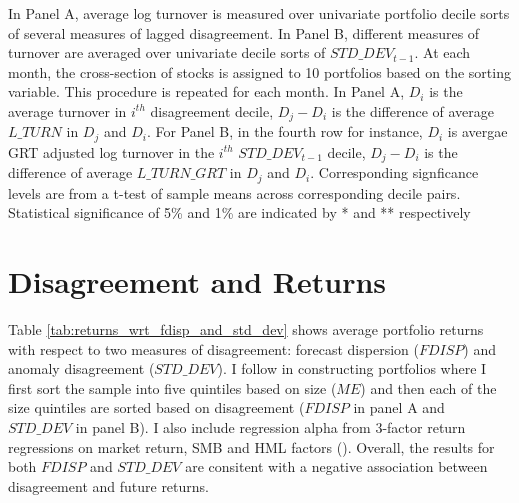 \documentclass[
  11pt,
  a4paper,
  twoside,
  onecolumn]{article}
\begin{document}
\begin{landscape}
\begin{table}
\begin{threeparttable}
\begin{tablenotes}
\item In Panel A, average log turnover is measured over univariate portfolio decile sorts of several measures of lagged disagreement. In Panel B, different measures of turnover are averaged over univariate decile sorts of $STD\_DEV_{t-1}$. At each month, the cross-section of stocks is assigned to 10 portfolios based on the sorting variable. This procedure is repeated for each month. In Panel A, $D_i$ is the average turnover in $i^{th}$ disagreement decile, $D_j - D_i$ is the difference of average $L\_TURN$ in $D_j$ and $D_i$. For Panel B, in the fourth row for instance, $D_i$ is avergae GRT adjusted log turnover in the $i^{th}$ $STD\_DEV_{t-1}$ decile, $D_j - D_i$ is the difference of average $L\_TURN\_GRT$ in $D_j$ and $D_i$. Corresponding signficance levels are from a t-test of sample means across corresponding decile pairs. Statistical significance of 5\% and 1\% are indicated by * and ** respectively
\end{tablenotes}
\end{threeparttable}


\end{table}
\end{landscape}
\restoregeometry

\hypertarget{disagreement-and-returns}{%
\section{Disagreement and Returns}\label{disagreement-and-returns}}

Table \ref{tab:returns_wrt_fdisp_and_std_dev} shows average portfolio
returns with respect to two measures of disagreement: forecast
dispersion (\(FDISP\)) and anomaly disagreement (\(STD\_DEV\)). I follow
\cite{diether_etal2002} in constructing portfolios where I first sort
the sample into five quintiles based on size (\(ME\)) and then each of
the size quintiles are sorted based on disagreement (\(FDISP\) in panel
A and \(STD\_DEV\) in panel B). I also include regression alpha from
3-factor return regressions on market return, SMB and HML factors
(\cite{fama_french1992}). Overall, the results for both \(FDISP\) and
\(STD\_DEV\) are consitent with a negative association between
disagreement and future returns.
\end{document}
